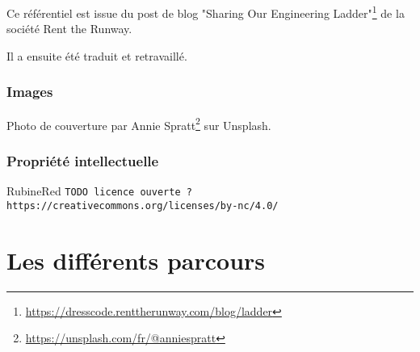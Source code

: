 \documentclass[a4paper, french, openany, 12pt]{book}
\newcommand{\fullwidthimage}[1]{
  \begin{center}
    \makebox[\textwidth]{\texttt{[image: \#1]}}
  \end{center}
}
\newcommand{\todo}[1]{
  \begin{color}{RubineRed}
    \texttt{TODO {#1}}
  \end{color}
}
\begin{document}
\begin{multicols}{2}
  Ce référentiel est issue du post de blog 
  "Sharing Our Engineering Ladder"\footnote{\url{https://dresscode.renttherunway.com/blog/ladder}}
  de la société Rent the Runway.
  
  Il a ensuite été traduit et retravaillé.
  
  \section*{Images}
  
  Photo de couverture par Annie Spratt\footnote{\url{https://unsplash.com/fr/@anniespratt}} sur Unsplash.
  
  \section*{Propriété intellectuelle}
  
  \todo{licence ouverte ? https://creativecommons.org/licenses/by-nc/4.0/}
  
\end{multicols}
  
\mainmatter

\part{Les différents parcours}

\fullwidthimage{images/tracks.png}
\end{document}
